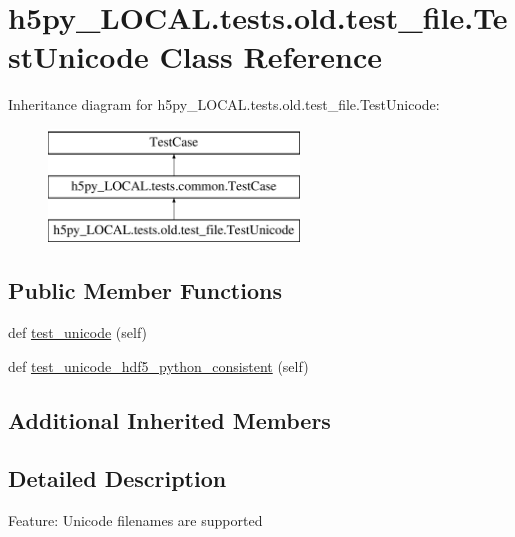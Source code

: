 \hypertarget{classh5py__LOCAL_1_1tests_1_1old_1_1test__file_1_1TestUnicode}{}\section{h5py\+\_\+\+L\+O\+C\+A\+L.\+tests.\+old.\+test\+\_\+file.\+Test\+Unicode Class Reference}
\label{classh5py__LOCAL_1_1tests_1_1old_1_1test__file_1_1TestUnicode}
Inheritance diagram for h5py\+\_\+\+L\+O\+C\+A\+L.\+tests.\+old.\+test\+\_\+file.\+Test\+Unicode\+:\begin{figure}[H]
\begin{center}
\leavevmode
\includegraphics[height=3.000000cm]{classh5py__LOCAL_1_1tests_1_1old_1_1test__file_1_1TestUnicode}
\end{center}
\end{figure}
\subsection*{Public Member Functions}
\begin{DoxyCompactItemize}
\item 
def \hyperlink{classh5py__LOCAL_1_1tests_1_1old_1_1test__file_1_1TestUnicode_ab463bc5a6431237d37b526927a2eaebd}{test\+\_\+unicode} (self)
\item 
def \hyperlink{classh5py__LOCAL_1_1tests_1_1old_1_1test__file_1_1TestUnicode_a03544377e7b1ef2aabed7c73c29c7fab}{test\+\_\+unicode\+\_\+hdf5\+\_\+python\+\_\+consistent} (self)
\end{DoxyCompactItemize}
\subsection*{Additional Inherited Members}


\subsection{Detailed Description}
\begin{DoxyVerb}    Feature: Unicode filenames are supported
\end{DoxyVerb}
 


